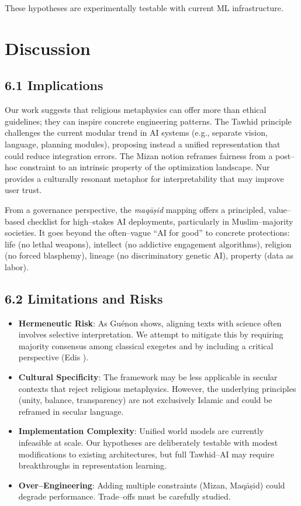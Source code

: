 \documentclass[12pt,twocolumn]{article}
\begin{document}
These hypotheses are experimentally testable with current ML infrastructure.

\section{Discussion}
\subsection*{6.1 Implications}
Our work suggests that religious metaphysics can offer more than ethical guidelines; they can inspire concrete engineering patterns. The Tawhid principle challenges the current modular trend in AI systems (e.g., separate vision, language, planning modules), proposing instead a unified representation that could reduce integration errors. The Mizan notion reframes fairness from a post--hoc constraint to an intrinsic property of the optimization landscape. Nur provides a culturally resonant metaphor for interpretability that may improve user trust.

From a governance perspective, the \emph{maqāṣid} mapping offers a principled, value--based checklist for high--stakes AI deployments, particularly in Muslim--majority societies. It goes beyond the often--vague ``AI for good'' to concrete protections: life (no lethal weapons), intellect (no addictive engagement algorithms), religion (no forced blasphemy), lineage (no discriminatory genetic AI), property (data as labor).

\subsection*{6.2 Limitations and Risks}
\begin{itemize}[leftmargin=*]
\item \textbf{Hermeneutic Risk}: As Guénon \citep{Guénon2019} shows, aligning texts with science often involves selective interpretation. We attempt to mitigate this by requiring majority consensus among classical exegetes and by including a critical perspective (Edis \citep{Edis}).
\item \textbf{Cultural Specificity}: The framework may be less applicable in secular contexts that reject religious metaphysics. However, the underlying principles (unity, balance, transparency) are not exclusively Islamic and could be reframed in secular language.
\item \textbf{Implementation Complexity}: Unified world models are currently infeasible at scale. Our hypotheses are deliberately testable with modest modifications to existing architectures, but full Tawhid--AI may require breakthroughs in representation learning.
\item \textbf{Over--Engineering}: Adding multiple constraints (Mizan, Maqāṣid) could degrade performance. Trade--offs must be carefully studied.
\end{itemize}
\end{document}
